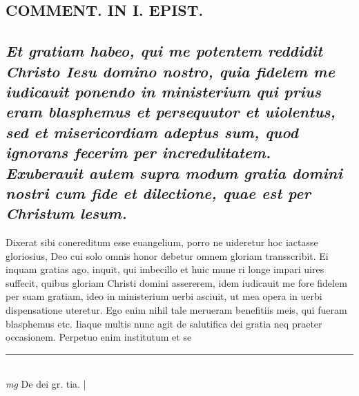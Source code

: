 \documentclass{article}
\begin{document}
\begin{pages}
\section*{COMMENT. IN I. EPIST. }
{}
\subsection*{\textit{Et gratiam habeo, qui me potentem reddidit Christo Iesu domino nostro, quia fidelem me iudicauit ponendo in ministerium qui prius eram blasphemus et persequutor et uiolentus, sed et misericordiam adeptus sum, quod ignorans fecerim per incredulitatem. Exuberauit autem supra modum gratia domini nostri cum fide et dilectione, quae est per Christum lesum. }}\pstart Dixerat sibi conereditum esse euangelium, porro ne uideretur hoc iactasse gloriosius, Deo cui solo omnis honor debetur omnem gloriam transscribit. Ei inquam gratias ago, inquit, qui imbecillo et huic mune ri longe impari uires suffecit, quibus gloriam Christi domini assererem, idem iudicauit me fore fidelem per suam gratiam, ideo in ministerium uerbi asciuit, ut mea opera in uerbi dispensatione uteretur. Ego enim nihil tale merueram benefitiis meis, qui fueram blasphemus etc. Iiaque multis nunc agit de salutifica dei gratia neq praeter occasionem. Perpetuo enim institutum et se\pend
\vspace{0.5cm}\noindent
\vspace{0.2cm}\rule{1cm}{0.2pt}\\ 
\hspace{0.2cm}\textit{mg}
\footnotesize De dei gr. tia. 
\normalsize| 

\end{pages}
\end{document}
